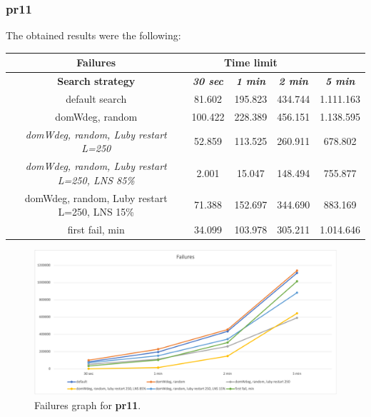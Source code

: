 \subsubsection{pr11}
The obtained results were the following:
{
\renewcommand{\arraystretch}{2}
\begin{longtable}[h]{| c | c | c | c | c |}
    \hline
    \textbf{Failures} & \multicolumn{3}{c}{Time limit} & \\
    \hline
    \textbf{Search strategy} & \textbf{\textit{30 sec}} & \textbf{\textit{1 min}} & \textbf{\textit{2 min}} & \textbf{\textit{5 min}} \\
    \hline
    \endhead
    default search                                         &  81.602 & 195.823 & 434.744 & 1.111.163 \\
    \hline
    domWdeg, random                                        & 100.422 & 228.389 & 456.151 & 1.138.595 \\
    \hline
    \textit{domWdeg, random, Luby restart L=250}           &  52.859 & 113.525 & 260.911 &  678.802 \\
    \hline
    \textit{domWdeg, random, Luby restart L=250, LNS 85\%} &   2.001 &  15.047 & 148.494 &  755.877 \\
    \hline
    domWdeg, random, Luby restart L=250, LNS 15\%          &  71.388 & 152.697 & 344.690 &  883.169 \\
    \hline
    first fail, min                                        &  34.099 & 103.978 & 305.211 & 1.014.646 \\
    \hline
\end{longtable}
}
\begin{figure}[H]
    \centering
    \includegraphics[width=0.8\columnwidth]{../graphs/pr11-failures.png}
    \caption{Failures graph for \textbf{pr11}.}
\end{figure}

